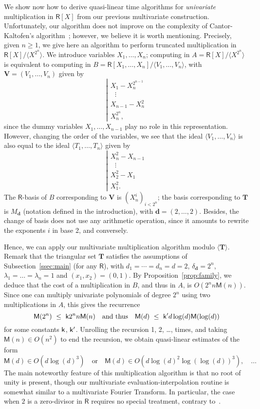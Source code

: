 \documentclass[amsthm]{elsart}
\def\d {\ensuremath{\mathbf{d}}}
\def\T {\ensuremath{\mathbf{T}}}
\def\M {\ensuremath{\mathsf{M}}}
\def\V {\ensuremath{\mathbf{V}}}
\def\rng {\ensuremath{\mathsf{R}}}
\theoremstyle{plain}
\begin{document}
We show now how to derive quasi-linear time algorithms for {\em
  univariate} multiplication in $\rng[X]$ from our previous
multivariate construction. Unfortunately, our algorithm does not
improve on the complexity of Cantor-Kaltofen's
algorithm~\cite{CaKa91}; however, we believe it is worth mentioning.
Precisely, given $n \ge 1$, we give here an algorithm to perform
truncated multiplication in $\rng[X]/\langle X^{2^n}\rangle$. We
introduce variables $X_1,\dots,X_n$; computing in $A=\rng[X]/\langle
X^{2^n} \rangle$ is equivalent to computing in
$B=\rng[X_1,\dots,X_n]/\langle V_1,\dots,V_n \rangle$, with
$\V=(V_1,\dots,V_n)$ given by
$$\left | 
\begin{array}{l}
X_1-X_n^{2^{n-1}}\\
~~~\vdots\\
X_{n-1}-X_n^2\\
X_n^{2^n},
\end{array}\right .
$$
since the dummy variables $X_1,\dots,X_{n-1}$ play no role in this
representation. However, changing the order of the variables, we see
that the ideal $\langle V_1,\dots,V_n \rangle$ is also equal to the ideal
$\langle T_1,\dots,T_n \rangle$ given by
$$\left | 
\begin{array}{l}X_n^2-X_{n-1}\\
~~~\vdots\\
X_2^2-X_1\\
X_1^2.
\end{array}\right .
$$
The $\rng$-basis of $B$ corresponding to $\V$ is $(X_n^i)_{i < 2^n}$;
the basis corresponding to $\T$ is $M_\d$ (notation defined in the
introduction), with $\d=(2,\dots,2)$. Besides, the change of basis
does not use any arithmetic operation, since it amounts to rewrite
the exponents $i$ in base 2, and conversely.

Hence, we can apply our multivariate multiplication algorithm modulo
$\langle \T \rangle$. Remark that the triangular set $\T$ satisfies
the assumptions of Subsection~\ref{ssec:main} (for any $\rng$), with
$d_1=\cdots=d_n=d=2$, $\delta_\d=2^n$, $\lambda_1=\dots=\lambda_n=1$
and $(x_1,x_2)=(0,1)$.  By Proposition~\ref{prop:family}, we deduce
that the cost of a multiplication in $B$, and thus in $A$, is $O(2^n n
\M(n)).$ Since one can multiply univariate polynomials of degree $2^n$
using two multiplications in $A$, this gives the recurrence
$$\M(2^n)\ \le\ {\sf k}  2^n n \M(n) \quad\text{and thus}\quad
\M(d)\ \le\ {\sf k}'  d \log(d) \M(\log(d))
$$
for some constants ${\sf k}$, ${\sf k}'$. Unrolling the recursion 1,
2, \dots, times, and taking $\M(n)\in O(n^2)$ to end the recursion, we
obtain quasi-linear estimates of the form
$$\M(d) \in O(d\log(d)^3) \quad\text{or} \quad \M(d) \in O(d\log(d)^2\log(\log(d))^3), \quad \dots$$
The main noteworthy feature of this multiplication algorithm is that
no root of unity is present, though our multivariate
evaluation-interpolation routine is somewhat similar to a multivariate
Fourier Transform.  In particular, the case when $2$ is a zero-divisor
in $\rng$ requires no special treatment, contrary to~\cite{CaKa91}.
\end{document}
